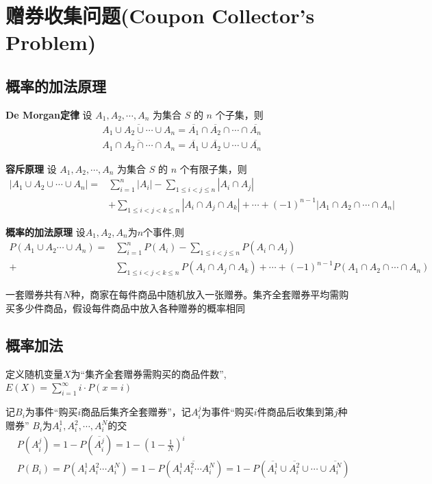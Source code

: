 \documentclass[10t, a4paper, oneside]{ctexbook}
\begin{document}
\section{赠券收集问题(Coupon Collector's Problem)}
\subsection{概率的加法原理}

\textbf{De Morgan定律}
设 $A_1,A_2,\cdots,A_n$ 为集合 $S$ 的 $n$ 个子集，则 $$\begin{aligned}&\overline{A_1\cup A_2\cup\cdots\cup A_n}={\overline{A_1}\cap \overline{A_2}\cap\cdots\cap \overline{A_n}}\\
&\overline{A_{1}\cap A_{2}\cap\cdots\cap A_{n}}=\overline{A_{1}}\cup\overline{A_{2}}\cup\cdots\cup\overline{A_{n}}\end{aligned}$$

\textbf{容斥原理}
设 $A_1,A_2,\cdots,A_n$ 为集合 $S$ 的 $n$ 个有限子集，则
$$\begin{aligned}
    \left|A_{1}\cup A_{2}\cup\cdots\cup A_{n}\right|=&\sum_{i=1}^{n}\left|A_{i}\right|-\sum_{1\le i<j\le n}\left|A_{i}\cap A_{j}\right|\\
    &+\sum_{1\leq i<j<k\leq n}\left|A_{i}\cap A_{j}\cap A_{k}\right|+\cdots+(-1)^{n-1}\left|A_{1}\cap A_{2}\cap\cdots\cap A_{n}\right|
\end{aligned}$$

\textbf{概率的加法原理}
设$A_1, A_2,A_n$为$n$个事件,则
$$\begin{aligned}P(A_1\cup A_2 \cdots \cup A_n) = &\sum_{i = 1}^n P(A_i) - \sum_{1 \le i < j \le n}P(A_i \cap A_j) \\
    +& \sum_{1 \le i< j < k\le n}P(A_i \cap A_j \cap A_k) + \cdots + (-1)^{n-1}P(A_1\cap A_2 \cap \cdots \cap A_n)\end{aligned}$$

一套赠券共有$N$种，商家在每件商品中随机放入一张赠券。集齐全套赠券平均需购买多少件商品，假设每件商品中放入各种赠券的概率相同

\subsection{概率加法}
定义随机变量$X$为“集齐全套赠券需购买的商品件数”,$E(X) = \sum_{i = 1}^{\infty} i \cdot P(x = i)$

记$B_i$为事件“购买$i$商品后集齐全套赠券”，记$A_i^j$为事件“购买$i$件商品后收集到第$j$种赠券”
$B_i$为$A_i^1, A_i^2,\cdots,A_i^N$的交
$$\begin{aligned}
    &P(A_i^j) =  1-P(\overline{A_i^j}) = 1-(1-\frac{1}{N})^i\\
    &P(B_i) = P(A_i^1A_i^2\cdots A_i^N)=1-P\left(\overline{A_{i}^{1}A_{i}^{2}\cdots A_{i}^{N}}\right)=1-P\left(\overline{A_{i}^{1}}\cup\overline{A_{i}^{2}}\cup\cdots\cup\overline{A_{i}^{N}}\right)
\end{aligned}$$
\end{document}

